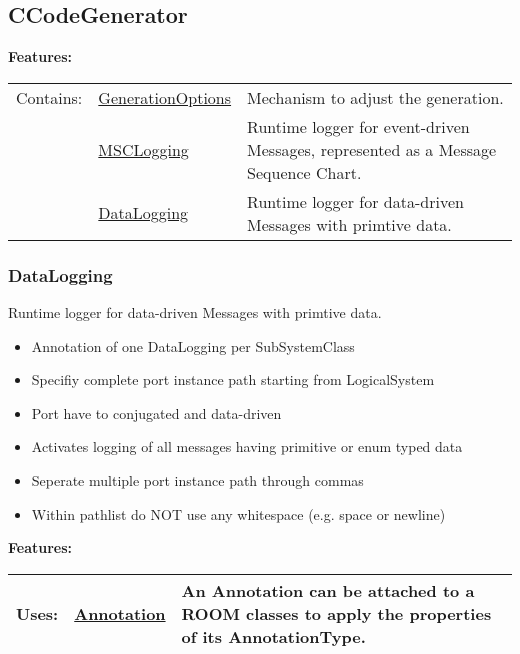 \subsection{CCodeGenerator}
	\hypertarget{ref:CCodeGenerator}{}
		
		
		
	\begingroup
	\textbf{Features:}
	\renewcommand{\arraystretch}{1.8} %
	\begin{longtable}{l|l p{}}
		\hline
	Contains: & \tabitem \hyperlink{ref:GenerationOptions}{GenerationOptions}  & Mechanism to adjust the generation.\\
	& \tabitem \hyperlink{ref:MSCLogging}{MSCLogging}  & Runtime logger for event-driven Messages, represented as a Message Sequence Chart. \\
	& \tabitem \hyperlink{ref:DataLogging}{DataLogging}  & Runtime logger for data-driven Messages with primtive data. \\
	\hline
	\end{longtable}
	\endgroup
		
		
	
	\vspace{\baselineskip}
	\vspace{\baselineskip}
	\vspace{\baselineskip}
	
\subsubsection{DataLogging}
	\hypertarget{ref:DataLogging}{}
	Runtime logger for data-driven Messages with primtive data.
		
	 \begin{itemize}
		\item Annotation of one \textsf{DataLogging} per SubSystemClass
		\item Specifiy complete port instance path starting from LogicalSystem
		\item Port have to conjugated and data-driven
		\item Activates logging of all messages having primitive or enum typed data
		\item Seperate multiple port instance path through commas
		\item Within \textsf{pathlist} do NOT use any whitespace (e.g. space or newline)
	\end{itemize}
		
		
	\begingroup
	\textbf{Features:}
	\renewcommand{\arraystretch}{1.8} %
	\begin{longtable}{l|l p{}}
		\hline
	Uses: & \tabitem \hyperlink{ref:Annotation}{Annotation}  & An Annotation can be attached to a ROOM classes to apply the properties of its AnnotationType.\\
	\hline
	\end{longtable}
	\endgroup
		
